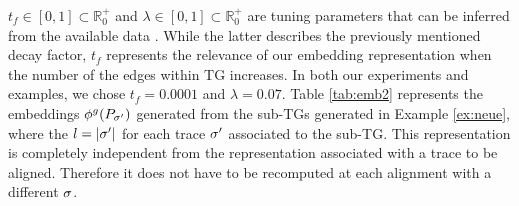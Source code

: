 \begin{example}\small \label{ex:withpaths} %
$t_f\in [0,1]\subset\mathbb{R}^+_{0}$ and $\lambda\in [0,1]\subset\mathbb{R}^+_{0}$ are tuning parameters that can be inferred from the available data \cite{DriessensRG06}. While the latter describes the previously mentioned decay factor, $t_f$ represents the relevance of our embedding representation when the number of the edges within TG increases. In both our experiments and examples, we chose $t_f=0.0001$ and $\lambda=0.07$.
Table \ref{tab:emb2} represents the embeddings $\phi^{g}(P_{\sigma'})$ generated from the sub-TGs generated in Example \ref{ex:neue}, where the $l=|{\sigma'}|$ for each trace ${\sigma'}$ associated to the sub-TG. This representation is completely independent from the representation associated with a trace to be aligned. Therefore it does not have to be recomputed at each alignment with a different $\sigma$.

\end{example}
